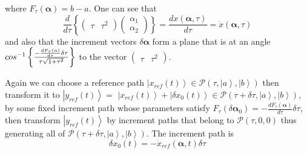 \documentclass[aps,preprint]{revtex4}
\begin{document}
where $F_{\tau }\left( \mathbf{\alpha }\right) =b-a$. One can see that
\begin{equation}
\frac{d}{d\tau }\left\{ \left(
\begin{array}{cc}
\tau & \tau ^{2}%
\end{array}%
\right) \left(
\begin{array}{c}
\alpha _{1} \\
\alpha _{2}%
\end{array}%
\right) \right\} =\frac{dx\left( \mathbf{\alpha },\tau \right) }{d\tau }=%
\dot{x}\left( \mathbf{\alpha },\tau \right)
\end{equation}
and also that the increment vectors $\delta \mathbf{\alpha }$ form a plane
that is at an angle $cos^{-1}\left\{ \frac{-\frac{dF_{\tau }\left( \mathbf{%
\alpha }\right) }{d\tau }\delta \tau }{\tau \sqrt{1+\tau ^{2}}}\right\} $ to
the vector $\left(
\begin{array}{cc}
\tau & \tau ^{2}%
\end{array}%
\right) $.

Again we can choose a reference path $\left\vert x_{ref}\left( t\right)
\right\rangle \in \mathcal{P}\left( \tau ,\left\vert a\right\rangle
,\left\vert b\right\rangle \right) $ then transform it to $\left\vert
y_{ref}\left( t\right) \right\rangle =$ $\left\vert x_{ref}\left( t\right)
\right\rangle +\left\vert \delta x_{0}\left( t\right) \right\rangle \in
\mathcal{P}\left( \tau +\delta \tau ,\left\vert a\right\rangle ,\left\vert
b\right\rangle \right) $, by some fixed increment path whose parameters
satisfy $F_{\tau }\left( \delta \mathbf{\alpha }_{0}\right) =-\frac{dF_{\tau
}\left( \mathbf{\alpha }\right) }{d\tau }\delta \tau $, then transform $%
\left\vert y_{ref}\left( t\right) \right\rangle $ by increment paths that
belong to $\mathcal{P}\left( \tau ,0,0\right) $ thus generating all of $%
\mathcal{P}\left( \tau +\delta \tau ,\left\vert a\right\rangle ,\left\vert
b\right\rangle \right) $. The increment path is
\begin{equation}
\delta x_{0}\left( t\right) =-\dot{x}_{ref}\left( \mathbf{\alpha },t\right)
\delta \tau
\end{equation}
\end{document}

